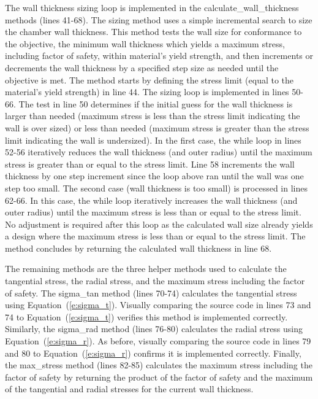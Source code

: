 \documentclass{article}
\begin{document}
The wall thickness sizing loop is implemented in the calculate\_wall\_thickness methods (lines 41-68).  The sizing method uses a simple incremental search to size the chamber wall thickness.  This method tests the wall size for conformance to the objective, the minimum wall thickness which yields a maximum stress, including factor of safety, within material's yield strength, and then increments or decrements the wall thickness by a specified step size as needed until the objective is met.  The method starts by defining the stress limit (equal to the material's yield strength) in line 44.  The sizing loop is implemented in lines 50-66.  The test in line 50 determines if the initial guess for the wall thickness is larger than needed (maximum stress is less than the stress limit indicating the wall is over sized) or less than needed (maximum stress is greater than the stress limit indicating the wall is undersized).  In the first case, the while loop in lines 52-56 iteratively reduces the wall thickness (and outer radius) until the maximum stress is greater than or equal to the stress limit.  Line 58 increments the wall thickness by one step increment since the loop above ran until the wall was one step too small.  The second case (wall thickness is too small) is processed in lines 62-66.  In this case, the while loop iteratively increases the wall thickness (and outer radius) until the maximum stress is less than or equal to the stress limit.  No adjustment is required after this loop as the calculated wall size already yields a design where the maximum stress is less than or equal to the stress limit.  The method concludes by returning the calculated wall thickness in line 68.

The remaining methods are the three helper methods used to calculate the tangential stress, the radial stress, and the maximum stress including the factor of safety.  The sigma\_tan method (lines 70-74) calculates the tangential stress using Equation~(\ref{e:sigma_t}).  Visually comparing the source code in lines 73 and 74 to Equation~(\ref{e:sigma_t}) verifies this method is implemented correctly.  Similarly, the sigma\_rad method (lines 76-80) calculates the radial stress using Equation~(\ref{e:sigma_r}).  As before, visually comparing the source code in lines 79 and 80 to Equation~(\ref{e:sigma_r}) confirms it is implemented correctly.  Finally, the max\_stress method (lines 82-85) calculates the maximum stress including the factor of safety by returning the product of the factor of safety and the maximum of the tangential and radial stresses for the current wall thickness.
\end{document}
